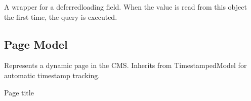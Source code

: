 \documentclass[a4paper,12pt,ngerman]{sphinxmanual}
\begin{document}
\begin{fulllineitems}
\begin{fulllineitems}
\label{\detokenize{sections/models:pages_app.models.base.TimestampedModel.get_previous_by_updated_at}}
\pysigstartsignatures
\pysiglinewithargsret
{}
{\sphinxparamcomma {}\sphinxparamcomma {}\sphinxparamcomma {}}
{}
\pysigstopsignatures
\end{fulllineitems}


\begin{fulllineitems}
\label{\detokenize{sections/models:id1}}
\pysigstartsignatures
\pysigline
{}
\pysigstopsignatures
\sphinxAtStartPar
A wrapper for a deferred\sphinxhyphen{}loading field. When the value is read from this
object the first time, the query is executed.

\end{fulllineitems}


\end{fulllineitems}



\subsection{Page Model}
\label{\detokenize{sections/models:page-model}}\label{\detokenize{sections/models:module-pages_app.models.Page}}
\sphinxAtStartPar
Represents a dynamic page in the CMS.
Inherits from TimestampedModel for automatic timestamp tracking.

\begin{fulllineitems}
\label{\detokenize{sections/models:pages_app.models.Page.title}}
\pysigstartsignatures
\pysigline
{}
\pysigstopsignatures
\sphinxAtStartPar
Page title
\begin{quote}\begin{description}
\sphinxAtStartPar
{}

\end{description}\end{quote}

\end{fulllineitems}
\end{document}
